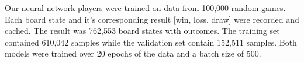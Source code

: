 

Our neural network players were trained on data from 100,000 random games.  Each board state and it's corresponding result [win, loss, draw] were recorded and cached.  The result was 762,553 board states with outcomes.  The training set contained 610,042 samples while the validation set contain 152,511 samples. Both models were trained over 20 epochs of the data and a batch size of 500.